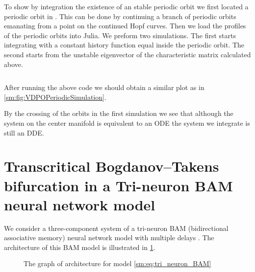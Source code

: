 To show by integration the existence of an stable periodic orbit we first
located a periodic orbit in \DDEBIFTOOL. This can be done by continuing a
branch of periodic orbits emanating from a point on the continued Hopf curves.
Then we load the profiles of the periodic orbits into Julia. We preform
two simulations. The first starts integrating with a constant history function
equal inside the periodic orbit. The second starts from the unstable eigenvector
of the characteristic matrix calculated above.
\inputminted[firstline=230, lastline=279]{julia}{\pathToJuliaFiles/vdpo_simulation_article.jl}
After running the above code we should obtain a similar plot as in \cref{sm:fig:VDPOPeriodicSimulation}.
\begin{remark}
By the crossing of the orbits in the first simulation we see that although
the system on the center manifold is equivalent to an ODE the system we
integrate is still an DDE.
\end{remark}


\section[Tri-neuron BAM neural network model]
        {Transcritical Bogdanov--Takens bifurcation in a Tri-neuron BAM neural network model}
We consider a three-component system of a tri-neuron BAM (bidirectional
associative memory) neural network model with multiple delays
\cite{dong2013bogdanov}. The architecture of this BAM model is illustrated in
\cref{sm:fig:BAM_architecture_graph}. 

\begin{figure}
\centering
{}
\caption{The graph of architecture for model \cref{sm:eq:tri_neuron_BAM}}
\label{sm:fig:BAM_architecture_graph}
\end{figure}

